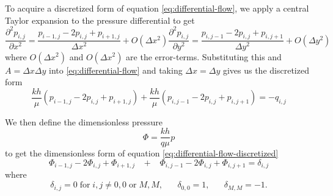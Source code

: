 To acquire a discretized form of equation \eqref{eq:differential-flow}, we apply a central Taylor expansion to the pressure differential to get
\begin{subequations}
    \begin{equation}
        \frac{\partial^2 p_{i,j}}{\partial x^2} = \frac{p_{i-1,j} -2p_{i,j} + p_{i+1,j}}{\Delta x^2} + O(\Delta x^2)
    \end{equation}
    \begin{equation}
        \frac{\partial^2 p_{i,j}}{\partial y^2} = \frac{p_{i,j-1} -2p_{i,j} + p_{i,j+1}}{\Delta y^2} + O(\Delta y^2)
    \end{equation}
\end{subequations}
where $O(\Delta x^2)$ and $O(\Delta x^2)$ are the error-terms. Substituting this and $A=\Delta x \Delta y$ into \eqref{eq:differential-flow} and taking $\Delta x = \Delta y$ gives us the discretized form
\begin{equation}
    \label{eq:differential-flow-discretized}
    \frac{kh}{\mu} \left( p_{i-1,j} -2p_{i,j} + p_{i+1,j} \right) + \frac{kh}{\mu} \left( p_{i,j-1} -2p_{i,j} + p_{i,j+1} \right) = -q_{i,j}
\end{equation}

We then define the dimensionless pressure
\begin{equation}
      \Phi = \frac{kh}{q\mu} p
\end{equation}
to get the dimensionless form of equation \eqref{eq:differential-flow-discretized} \cite{Peaceman1978Interpretation}
\begin{equation}
    \label{eq:differential-flow-discretzed-dimensionless}
     \Phi_{i-1,j} -2 \Phi_{i,j} + \Phi_{i+1,j} \;\;\; + \;\;\; \Phi_{i,j-1} -2\Phi_{i,j} + \Phi_{i,j+1}  = \delta_{i,j}
\end{equation}
where
\begin{equation}
    \delta_{i,j} = 0 \;\mathrm{for}\; i,j \neq 0,0 \;\mathrm{or}\; M,M, \;\;\;\;\;\;
    \delta_{0,0} = 1, \;\;\;\;\;\;
    \delta_{M,M} = -1.
\end{equation}

